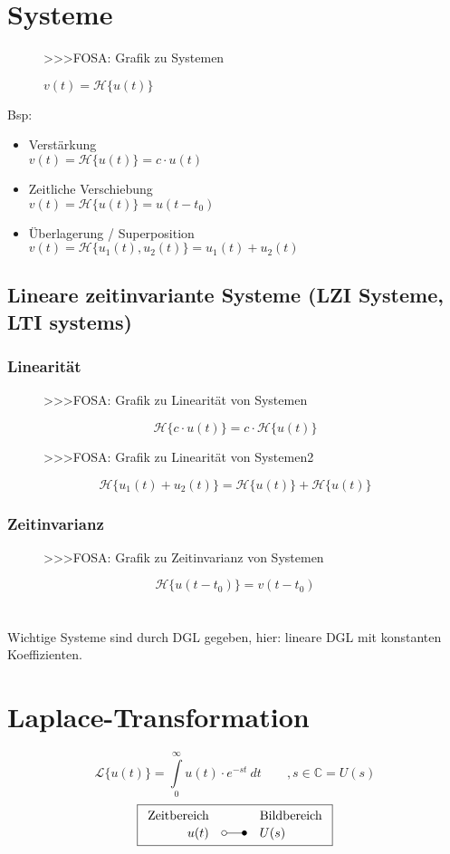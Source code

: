 \section{Systeme}
\begin{figure}[h!]
    \centering
    >>>FOSA: Grafik zu Systemen
    \caption{$v(t) = \mathcal{H}\lbrace u(t) \rbrace$}
    \label{fig:system}
\end{figure}
Bsp: 
\begin{itemize}
  \item Verstärkung \\
        $v(t) = \mathcal{H} \lbrace u(t) \rbrace = c \cdot u(t)$
  \item Zeitliche Verschiebung \\
        $v(t) = \mathcal{H} \lbrace u(t) \rbrace = u(t - t_0)$
  \item Überlagerung / Superposition \\
        $v(t) = \mathcal{H} \lbrace u_1(t), u_2(t) \rbrace = u_1(t) + u_2(t)$
\end{itemize}

\subsection{Lineare zeitinvariante Systeme (LZI Systeme, LTI systems)}
\subsubsection{Linearität}
\begin{figure}[h!]
    \centering
    >>>FOSA: Grafik zu Linearität von Systemen
    \caption{}
    \label{fig:linsystem}
\end{figure}
\[ \boxed{\mathcal{H} \lbrace c \cdot u(t) \rbrace 
= c \cdot \mathcal{H} \lbrace u(t) \rbrace} \]
\begin{figure}[h!]
    \centering
    >>>FOSA: Grafik zu Linearität von Systemen2
    \label{fig:linsystem2}
\end{figure}
\[ \boxed{\mathcal{H} \lbrace u_1(t) + u_2(t) \rbrace 
= \mathcal{H} \lbrace u(t) \rbrace + \mathcal{H} \lbrace u(t) \rbrace} \]

\subsubsection{Zeitinvarianz}
\begin{figure}[h!]
    \centering
    >>>FOSA: Grafik zu Zeitinvarianz von Systemen
    \caption{}
    \label{fig:timesystem}
\end{figure}
\[ \boxed{\mathcal{H} \lbrace u(t-t_0) \rbrace 
= v(t - t_0)} \]
\\\\
Wichtige Systeme sind durch DGL gegeben, hier: lineare DGL mit konstanten 
Koeffizienten. 

\section{Laplace-Transformation}
\[ \boxed{\mathcal{L} \lbrace u(t) \rbrace 
= \int\limits_{0}^{\infty} u(t) \cdot e^{-st} ~ dt \qquad , s \in \mathbb{C} 
= U(s)} \]
\[ \boxed{\begin{array}{rcl}
\text{Zeitbereich} &  & \text{Bildbereich} \\
u(t) & \laplace & U(s)
\end{array}} \]
